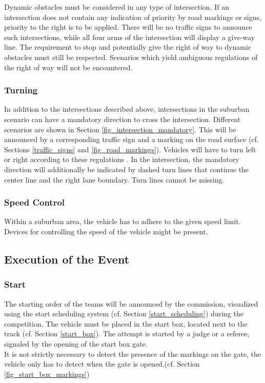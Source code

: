 Dynamic obstacles must be considered in any type of intersection. If an
intersection does not contain any indication of priority by road markings or
signs, priority to the right is to be applied. There will be no traffic signs
to announce such intersections, while all four arms of the intersection will
display a give-way line. The requirement to stop and potentially give the right
of way to dynamic obstacles must still be respected. Scenarios which yield
ambiguous regulations of the right of way will not be encountered.

\subsubsection{Turning}
\label{turning}

In addition to the intersections described above, intersections in the suburban
scenario can have a mandatory direction to cross the intersection. Different
scenarios are shown in Section \ref{fig_intersection_mandatory}. This will be
announced by a corresponding traffic sign and a marking on the road surface
(cf. Sections \ref{traffic_signs} and \ref{fig_road_markings}). Vehicles will
have to turn left or right according to these regulations . In the intersection, the
mandatory direction will additionally be indicated by dashed turn lines that
continue the center line and the right lane boundary. Turn lines cannot be
missing.

\subsubsection{Speed Control}

Within a suburban area, the vehicle has to adhere to the given speed limit.
Devices for controlling the speed of the vehicle might be present.

\subsection{Execution of the Event}

\subsubsection{Start}

The starting order of the teams will be announced by the commission, visualized
using the start scheduling system (cf. Section \ref{start_scheduling}) during
the competition. The vehicle must be placed in the start box, located next to
the track (cf. Section \ref{start_box}). The attempt is started by a judge or a
referee, signaled by the opening of the start box gate.\\ It is not strictly
necessary to detect the presence of the markings on the gate, the vehicle only
has to detect when the gate is opened.(cf. Section
\ref{fig_start_box_markings})


